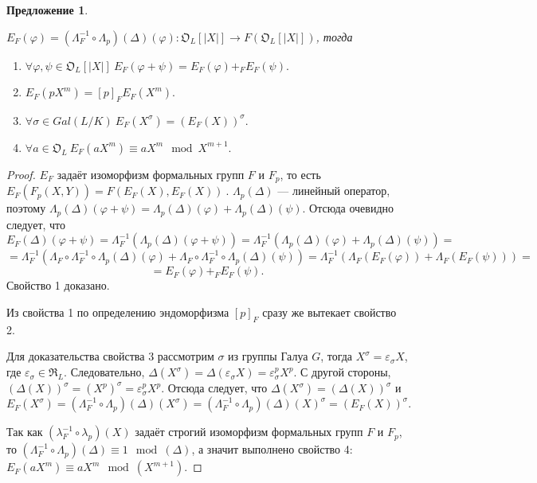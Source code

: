 \documentclass[a4paper]{article}
\newcommand{\OL}{\mathfrak{O}_L}
\newcommand{\RL}{\mathfrak{R}_L}
\newtheorem{proposition}{Предложение}
\begin{document}
\begin{proposition}\
	
	$E_F(\varphi)=(\Lambda_F^{-1}\circ\Lambda_{p})(\Delta)(\varphi):\OL[|X|]\rightarrow F(\OL[|X|])$, тогда
	
	\begin{enumerate}
		\item $\forall\varphi,\psi\in\OL[|X|]\ E_F(\varphi+\psi)=E_F(\varphi)+_FE_F(\psi).$
		\item $E_F(pX^m)=[p]_FE_F(X^m).$
		\item $\forall\sigma\in Gal(L/K)\ E_F(X^\sigma)=(E_F(X))^\sigma.$
		\item $\forall a\in\OL\ E_F(aX^m)\equiv aX^m\mod X^{m+1}.$
	\end{enumerate}
\end{proposition}
\begin{proof}
	$E_F$ задаёт изоморфизм формальных групп $F$ и $F_{p}$, то есть $E_F(F_{p}(X,Y))=F(E_F(X),E_F(X))\ $. $\Lambda_{p}(\Delta)$ --- линейный оператор, поэтому $\Lambda_{p}(\Delta)(\varphi+\psi)=\Lambda_{p}(\Delta)(\varphi)+\Lambda_{p}(\Delta)(\psi)$. Отсюда очевидно следует, что
	$$E_F(\Delta)(\varphi+\psi)=\Lambda_F^{-1}\left(\Lambda_{p}(\Delta)(\varphi+\psi)\right)=\Lambda_F^{-1}\left(\Lambda_{p}(\Delta)(\varphi)+\Lambda_{p}(\Delta)(\psi)\right)=$$
	$$=\Lambda_F^{-1}\left(\Lambda_F\circ\Lambda_F^{-1}\circ\Lambda_{p}(\Delta)(\varphi)+\Lambda_F\circ\Lambda_F^{-1}\circ\Lambda_{p}(\Delta)(\psi)\right)=\Lambda_F^{-1}\left(\Lambda_F(E_F(\varphi))+\Lambda_F(E_F(\psi))\right)=$$
	$$=E_F(\varphi)+_FE_F(\psi).$$
	Свойство 1 доказано.
	
	Из свойства 1 по определению эндоморфизма $[p]_F$ сразу же вытекает свойство 2.
	
	Для доказательства свойства 3 рассмотрим $\sigma$ из группы Галуа $G$, тогда $X^\sigma=\varepsilon_\sigma X$, где $\varepsilon_\sigma\in\RL$. Следовательно, $\Delta(X^\sigma)=\Delta(\varepsilon_\sigma X)=\varepsilon_\sigma^p X^p$. С другой стороны, $(\Delta(X))^\sigma=(X^p)^\sigma=\varepsilon_\sigma^pX^p$. Отсюда следует, что $\Delta(X^\sigma)=(\Delta(X))^\sigma$ и 
	$$E_F(X^\sigma)=(\Lambda_F^{-1}\circ\Lambda_{p})(\Delta)(X^\sigma)=(\Lambda_F^{-1}\circ\Lambda_{p})(\Delta)(X)^\sigma=(E_F(X))^\sigma.$$
	
	Так как $(\lambda_F^{-1}\circ\lambda_{p})(X)$ задаёт строгий изоморфизм формальных групп $F$ и $F_{p}$, то $(\Lambda_F^{-1}\circ\Lambda_{p})(\Delta)\equiv1\mod(\Delta)$, а значит выполнено свойство 4: $E_F(aX^m)\equiv aX^m\mod(X^{m+1})$.
\end{proof}
\end{document}
